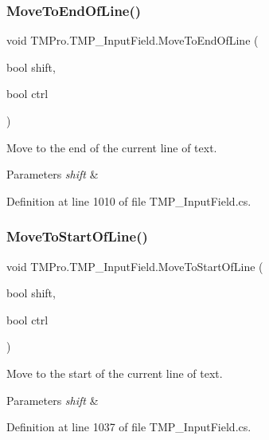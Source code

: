 \subsubsection{\texorpdfstring{MoveToEndOfLine()}{MoveToEndOfLine()}}
{\footnotesize\ttfamily void T\+M\+Pro.\+T\+M\+P\+\_\+\+Input\+Field.\+Move\+To\+End\+Of\+Line (\begin{DoxyParamCaption}\item[{bool}]{shift,  }\item[{bool}]{ctrl }\end{DoxyParamCaption})}



Move to the end of the current line of text. 


\begin{DoxyParams}{Parameters}
{\em shift} & \\
\hline
\end{DoxyParams}


Definition at line 1010 of file T\+M\+P\+\_\+\+Input\+Field.\+cs.

\mbox{\label{class_t_m_pro_1_1_t_m_p___input_field_ad0c485854da42ede16b5127258120c40}} 
\subsubsection{\texorpdfstring{MoveToStartOfLine()}{MoveToStartOfLine()}}
{\footnotesize\ttfamily void T\+M\+Pro.\+T\+M\+P\+\_\+\+Input\+Field.\+Move\+To\+Start\+Of\+Line (\begin{DoxyParamCaption}\item[{bool}]{shift,  }\item[{bool}]{ctrl }\end{DoxyParamCaption})}



Move to the start of the current line of text. 


\begin{DoxyParams}{Parameters}
{\em shift} & \\
\hline
\end{DoxyParams}


Definition at line 1037 of file T\+M\+P\+\_\+\+Input\+Field.\+cs.

\mbox{\label{class_t_m_pro_1_1_t_m_p___input_field_afb0884739580ae97b441c56b1018786a}} 
